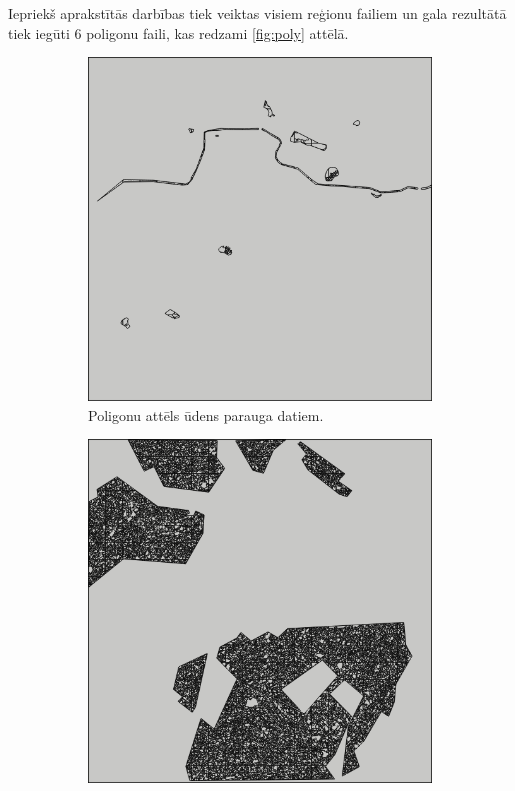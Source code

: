 \documentclass[12pt,paper=a4]{report}
\begin{document}
Iepriekš aprakstītās darbības tiek veiktas visiem reģionu failiem un gala rezultātā tiek iegūti 6 poligonu faili, kas redzami \ref{fig:poly} attēlā.
\begin{figure}[h!]
\centering
\begin{subfigure}[b]{.3\linewidth}
\includegraphics[width=\linewidth]{udensPolygons}
\caption{Poligonu attēls ūdens parauga datiem.}\label{fig:udensPoly}
\end{subfigure}
\begin{subfigure}[b]{.3\linewidth}
\includegraphics[width=\linewidth]{kokiPolygons}

\end{subfigure}
\end{figure}
\end{document}
